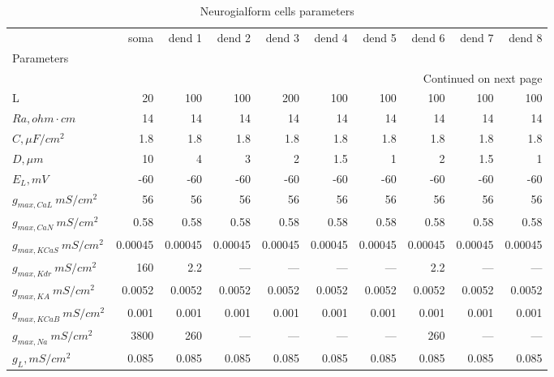 \begin{longtable}{lrrrrrrrrr}
\caption{Neurogialform cells parameters}\label{ca1__cell_parameters}\\
\toprule
{} &    soma &  dend 1 &  dend 2 &  dend 3 &  dend 4 &  dend 5 &  dend 6 &  dend 7 &  dend 8 \\
Parameters         &         &         &         &         &         &         &         &         &         \\
\midrule
\endhead
\midrule
\multicolumn{10}{r}{{Continued on next page}} \\
\midrule
\endfoot

\bottomrule
\endlastfoot
L                  &      20 &     100 &     100 &     200 &     100 &     100 &     100 &     100 &     100 \\
$Ra,
 ohm \cdot cm$                 &      14 &      14 &      14 &      14 &      14 &      14 &      14 &      14 &      14 \\
$C, \mu F / cm^2$                 &     1.8 &     1.8 &     1.8 &     1.8 &     1.8 &     1.8 &     1.8 &     1.8 &     1.8 \\
$D, \mu m$               &      10 &       4 &       3 &       2 &     1.5 &       1 &       2 &     1.5 &       1 \\
$E_L,  mV$          &     -60 &     -60 &     -60 &     -60 &     -60 &     -60 &     -60 &     -60 &     -60 \\
$g_{max, CaL       }\  mS / cm^2$&      56 &      56 &      56 &      56 &      56 &      56 &      56 &      56 &      56 \\
$g_{max, CaN       }\  mS / cm^2$&    0.58 &    0.58 &    0.58 &    0.58 &    0.58 &    0.58 &    0.58 &    0.58 &    0.58 \\
$g_{max, KCaS       }\  mS / cm^2$& 0.00045 & 0.00045 & 0.00045 & 0.00045 & 0.00045 & 0.00045 & 0.00045 & 0.00045 & 0.00045 \\
$g_{max, Kdr }\  mS / cm^2$&     160 &     2.2 &    ---  &    ---  &    ---  &    ---  &     2.2 &    ---  &    ---  \\
$g_{max, KA     }\  mS / cm^2$&  0.0052 &  0.0052 &  0.0052 &  0.0052 &  0.0052 &  0.0052 &  0.0052 &  0.0052 &  0.0052 \\
$g_{max, KCaB      }\  mS / cm^2$&   0.001 &   0.001 &   0.001 &   0.001 &   0.001 &   0.001 &   0.001 &   0.001 &   0.001 \\
$g_{max, Na     }\  mS / cm^2$&    3800 &     260 &    ---  &    ---  &    ---  &    ---  &     260 &    ---  &    ---  \\
$g_L,  mS / cm^2$       &   0.085 &   0.085 &   0.085 &   0.085 &   0.085 &   0.085 &   0.085 &   0.085 &   0.085 \\
\end{longtable}
